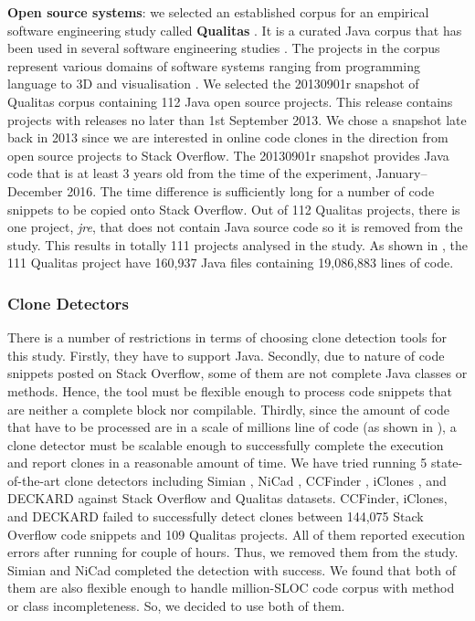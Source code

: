 \documentclass{sig-alternate-05-2015}
\begin{document}
\textbf{Open source systems}: we selected an established corpus for an empirical software engineering study called \textbf{Qualitas} \cite{QualitasCorpus}. It is a curated Java corpus that has been used in several software engineering studies \cite{Taube-Schock2011,Beckman2011,Vasilescu2011,Omar2012}. The projects in the corpus represent various domains of software systems ranging from programming language to 3D and visualisation \cite{QualitasCorpus}. We selected the 20130901r snapshot of Qualitas corpus containing 112 Java open source projects. This release contains projects with releases no later than 1st September 2013. We chose a snapshot late back in 2013 since we are interested in online code clones in the direction from open source projects to Stack Overflow. The 20130901r snapshot provides Java code that is at least 3 years old from the time of the experiment, January--December 2016. The time difference is sufficiently long for a number of code snippets to be copied onto Stack Overflow. Out of 112 Qualitas projects, there is one project, \textit{jre}, that does not contain Java source code so it is removed from the study. This results in totally 111 projects analysed in the study. As shown in , the 111 Qualitas project have 160,937 Java files containing 19,086,883 lines of code. %

\subsubsection{Clone Detectors}
There is a number of restrictions in terms of choosing clone detection tools for this study. Firstly, they have to support Java. Secondly, due to nature of code snippets posted on Stack Overflow, some of them are not complete Java classes or methods. Hence, the tool must be flexible enough to process code snippets that are neither a complete block nor compilable. Thirdly, since the amount of code that have to be processed are in a scale of millions line of code (as shown in ), a clone detector must be scalable enough to successfully complete the execution and report clones in a reasonable amount of time. We have tried running 5 state-of-the-art clone detectors including Simian \cite{simian}, NiCad \cite{Cordy,Roy2008}, CCFinder \cite{Kamiya2002}, iClones \cite{Gode2009}, and DECKARD \cite{Jiang2007a} against Stack Overflow and Qualitas datasets. CCFinder, iClones, and DECKARD failed to successfully detect clones between 144,075 Stack Overflow code snippets and 109 Qualitas projects. All of them reported execution errors after running for couple of hours. Thus, we removed them from the study. Simian and NiCad completed the detection with success. We found that both of them are also flexible enough to handle million-SLOC code corpus with method or class incompleteness. So, we decided to use both of them.
\end{document}
